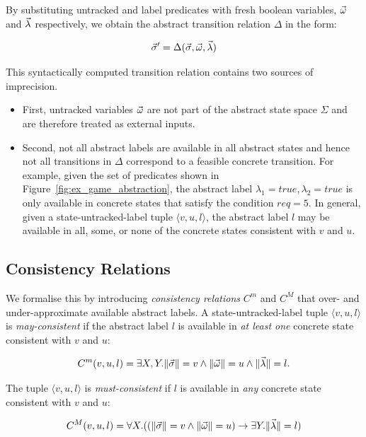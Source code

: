 By substituting untracked and label predicates with fresh boolean variables, $\vec{\omega}$ and $\vec{\lambda}$ respectively, we obtain the abstract transition relation $\Delta$ in the form:

$$
\vec{\sigma}'=\Delta(\vec{\sigma},\vec{\omega},\vec{\lambda})
$$

This syntactically computed transition relation contains two sources of imprecision.  

\begin{itemize}
    \item First, untracked variables $\vec{\omega}$ are not part of the abstract state space $\Sigma$ and are therefore treated as external inputs.  
    \item Second, not all abstract labels  are available in all abstract states and hence not all transitions in $\Delta$ correspond to a feasible concrete transition.  For example, given the set of predicates shown in Figure~\ref{fig:ex_game_abstraction}, the abstract label $\lambda_1 = true, \lambda_2 = true$ is only available in concrete states that satisfy the condition $req=5$.  In general, given a state-untracked-label tuple $\langle v,u,l\rangle$, the abstract label $l$ may be available in all, some, or none of the concrete states consistent with $v$ and $u$.  
\end{itemize}

\subsection{Consistency Relations}

We formalise this by introducing \emph{consistency relations} $C^m$ and $C^M$ that over- and under-approximate available abstract labels.  A state-untracked-label tuple $\langle v,u,l\rangle$ is \emph{may-consistent} if the abstract label $l$ is available in \emph{at least one} concrete state consistent with $v$ and $u$:

\begin{equation} 
    \label{eqn:cm}
    C^m(v,u,l) = \exists X,Y. \|\vec{\sigma}\|=v \land \|\vec{\omega}\|=u \land \|\vec{\lambda}\|=l.
\end{equation}

The tuple $\langle v,u,l\rangle$ is \emph{must-consistent} if $l$ is available in \emph{any} concrete state consistent with $v$ and $u$:

\begin{equation}
    \label{eqn:cM}
    C^M(v,u,l) = \forall X . ((\|\vec{\sigma}\|=v \land \|\vec{\omega}\|=u) \rightarrow \exists Y.  \|\vec{\lambda}\|=l)
\end{equation}

